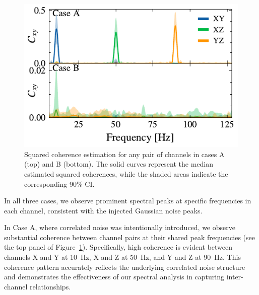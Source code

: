 \documentclass[%
 reprint,
 amsmath,amssymb,
 aps,
 nofootinbib,
]{revtex4-2}
\begin{document}
\begin{figure}
  \includegraphics[width=\columnwidth]{caseAB_coh.pdf}
  \caption{Squared coherence estimation for any pair of channels in cases A (top) and B (bottom). The solid curves represent the median estimated squared coherences, while the shaded areas indicate the corresponding 90\% CI.}
  \label{fig:squared_coh}
\end{figure}


In all three cases, we observe prominent spectral peaks at specific frequencies in each channel, consistent with the injected Gaussian noise peaks.

In Case A, where correlated noise was intentionally introduced, we observe substantial coherence between channel pairs at their shared peak frequencies (see the top panel of Figure~\ref{fig:squared_coh}). 
Specifically, high coherence is evident between channels X and Y at \SI{10}{Hz}, X and Z at \SI{50}{Hz}, and Y and Z at \SI{90}{Hz}. 
This coherence pattern accurately reflects the underlying correlated noise structure and demonstrates the effectiveness of our spectral analysis in capturing inter-channel relationships.
\end{document}

